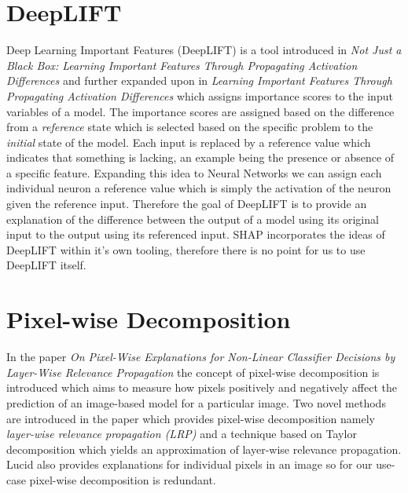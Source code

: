 \section{DeepLIFT}
Deep Learning Important Features (DeepLIFT) is a tool introduced in \emph{Not Just a Black Box: Learning Important Features Through Propagating Activation Differences} \cite{DBLP:journals/corr/ShrikumarGSK16} and further expanded upon in \emph{Learning Important Features Through Propagating Activation Differences} \cite{DBLP:journals/corr/ShrikumarGK17} which assigns importance scores to the input variables of a model. The importance scores are assigned based on the difference from a \emph{reference} state which is selected based on the specific problem to the \emph{initial} state of the model. Each input is replaced by a reference value which indicates that something is lacking, an example being the presence or absence of a specific feature. Expanding this idea to Neural Networks we can assign each individual neuron a reference value which is simply the activation of the neuron given the reference input. Therefore the goal of DeepLIFT is to provide an explanation of the difference between the output of a model using its original input to the output using its referenced input. SHAP incorporates the ideas of DeepLIFT within it's own tooling, therefore there is no point for us to use DeepLIFT itself.
\section{Pixel-wise Decomposition}
In the paper \emph{On Pixel-Wise Explanations for Non-Linear Classifier Decisions by Layer-Wise Relevance Propagation} \cite{Bach2015OnPropagation} the concept of pixel-wise decomposition is introduced which aims to measure how pixels positively and negatively affect the prediction of an image-based model for a particular image. Two novel methods are introduced in the paper which provides pixel-wise decomposition namely \emph{layer-wise relevance propagation (LRP)} and a technique based on Taylor decomposition \cite{DBLP:journals/corr/MontavonBBSM15} which yields an approximation of layer-wise relevance propagation. Lucid also provides explanations for individual pixels in an image so  for our use-case pixel-wise decomposition is redundant.

